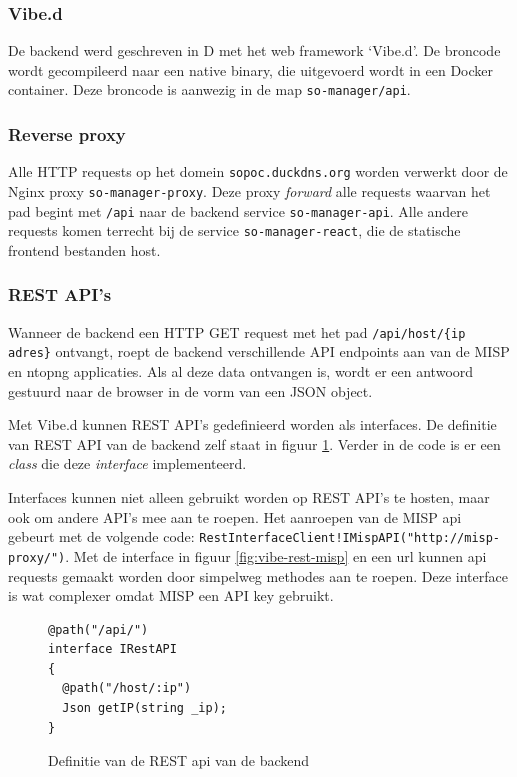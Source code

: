 \documentclass[a4paper,12pt]{report}
\begin{document}
\subsubsection{Vibe.d}
De backend werd geschreven in D met het web framework `Vibe.d'.
De broncode wordt gecompileerd naar een native binary, die uitgevoerd wordt in een Docker container.
Deze broncode is aanwezig in de map \lstinline|so-manager/api|.

\subsubsection{Reverse proxy}
Alle HTTP requests op het domein \lstinline|sopoc.duckdns.org| worden verwerkt door de Nginx proxy \lstinline|so-manager-proxy|.
Deze proxy \emph{forward} alle requests waarvan het pad begint met \lstinline|/api| naar de backend service \lstinline|so-manager-api|.
Alle andere requests komen terrecht bij de service \lstinline|so-manager-react|, die de statische frontend bestanden host.

\subsubsection{REST API's}
Wanneer de backend een HTTP GET request met het pad \lstinline|/api/host/{ip adres}| ontvangt, roept de backend verschillende API endpoints aan van de MISP en ntopng applicaties.
Als al deze data ontvangen is, wordt er een antwoord gestuurd naar de browser in de vorm van een JSON object.

Met Vibe.d kunnen REST API's gedefinieerd worden als interfaces.
De definitie van REST API van de backend zelf staat in figuur \ref{fig:vibe-rest-server}.
Verder in de code is er een \emph{class} die deze \emph{interface} implementeerd.

Interfaces kunnen niet alleen gebruikt worden op REST API's te hosten, maar ook om andere API's mee aan te roepen.
Het aanroepen van de MISP api gebeurt met de volgende code: \lstinline|RestInterfaceClient!IMispAPI("http://misp-proxy/")|.
Met de interface in figuur \ref{fig:vibe-rest-misp} en een url kunnen api requests gemaakt worden door simpelweg methodes aan te roepen.
Deze interface is wat complexer omdat MISP een API key gebruikt.

\begin{figure}[H]
  \begin{lstlisting}
@path("/api/")
interface IRestAPI
{
  @path("/host/:ip")
  Json getIP(string _ip);
}
  \end{lstlisting}
  \caption{Definitie van de REST api van de backend}
  \label{fig:vibe-rest-server}
\end{figure}
\end{document}

